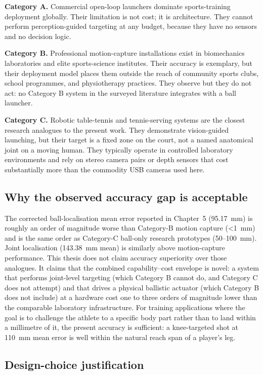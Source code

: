\textbf{Category A.} Commercial open-loop launchers dominate sports-training deployment globally. Their limitation is not cost; it is architecture. They cannot perform perception-guided targeting at any budget, because they have no sensors and no decision logic.

\textbf{Category B.} Professional motion-capture installations exist in biomechanics laboratories and elite sports-science institutes. Their accuracy is exemplary, but their deployment model places them outside the reach of community sports clubs, school programmes, and physiotherapy practices. They observe but they do not act: no Category B system in the surveyed literature integrates with a ball launcher.

\textbf{Category C.} Robotic table-tennis and tennis-serving systems \cite{ref24, ref25} are the closest research analogues to the present work. They demonstrate vision-guided launching, but their target is a fixed zone on the court, not a named anatomical joint on a moving human. They typically operate in controlled laboratory environments and rely on stereo camera pairs or depth sensors that cost substantially more than the commodity USB cameras used here.

\subsection{Why the observed accuracy gap is acceptable}

The corrected ball-localisation mean error reported in Chapter~5 (95.17~mm) is roughly an order of magnitude worse than Category-B motion capture (\textless{}1~mm) and is the same order as Category-C ball-only research prototypes (50--100~mm). Joint localisation (143.38~mm mean) is similarly above motion-capture performance. This thesis does not claim accuracy superiority over those analogues. It claims that the combined capability--cost envelope is novel: a system that performs joint-level targeting (which Category B cannot do, and Category C does not attempt) and that drives a physical ballistic actuator (which Category B does not include) at a hardware cost one to three orders of magnitude lower than the comparable laboratory infrastructure. For training applications where the goal is to challenge the athlete to a specific body part rather than to land within a millimetre of it, the present accuracy is sufficient: a knee-targeted shot at 110~mm mean error is well within the natural reach span of a player's leg.

\subsection{Design-choice justification}

